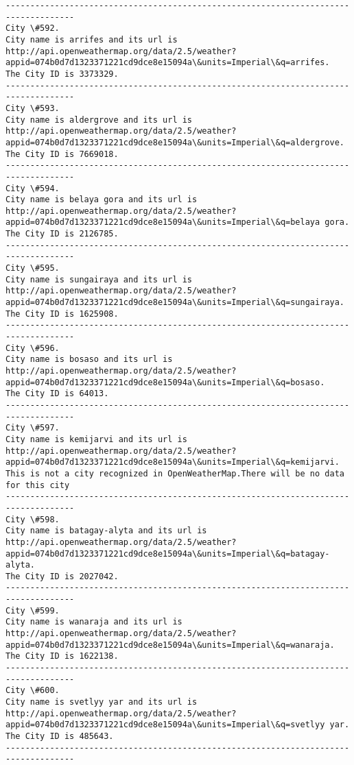 \documentclass[11pt]{article}
\begin{document}
\begin{Verbatim}[commandchars=\\\{\}]
------------------------------------------------------------------------------------
City \#592.
City name is arrifes and its url is http://api.openweathermap.org/data/2.5/weather?appid=074b0d7d1323371221cd9dce8e15094a\&units=Imperial\&q=arrifes.
The City ID is 3373329.
------------------------------------------------------------------------------------
City \#593.
City name is aldergrove and its url is http://api.openweathermap.org/data/2.5/weather?appid=074b0d7d1323371221cd9dce8e15094a\&units=Imperial\&q=aldergrove.
The City ID is 7669018.
------------------------------------------------------------------------------------
City \#594.
City name is belaya gora and its url is http://api.openweathermap.org/data/2.5/weather?appid=074b0d7d1323371221cd9dce8e15094a\&units=Imperial\&q=belaya gora.
The City ID is 2126785.
------------------------------------------------------------------------------------
City \#595.
City name is sungairaya and its url is http://api.openweathermap.org/data/2.5/weather?appid=074b0d7d1323371221cd9dce8e15094a\&units=Imperial\&q=sungairaya.
The City ID is 1625908.
------------------------------------------------------------------------------------
City \#596.
City name is bosaso and its url is http://api.openweathermap.org/data/2.5/weather?appid=074b0d7d1323371221cd9dce8e15094a\&units=Imperial\&q=bosaso.
The City ID is 64013.
------------------------------------------------------------------------------------
City \#597.
City name is kemijarvi and its url is http://api.openweathermap.org/data/2.5/weather?appid=074b0d7d1323371221cd9dce8e15094a\&units=Imperial\&q=kemijarvi.
This is not a city recognized in OpenWeatherMap.There will be no data for this city
------------------------------------------------------------------------------------
City \#598.
City name is batagay-alyta and its url is http://api.openweathermap.org/data/2.5/weather?appid=074b0d7d1323371221cd9dce8e15094a\&units=Imperial\&q=batagay-alyta.
The City ID is 2027042.
------------------------------------------------------------------------------------
City \#599.
City name is wanaraja and its url is http://api.openweathermap.org/data/2.5/weather?appid=074b0d7d1323371221cd9dce8e15094a\&units=Imperial\&q=wanaraja.
The City ID is 1622138.
------------------------------------------------------------------------------------
City \#600.
City name is svetlyy yar and its url is http://api.openweathermap.org/data/2.5/weather?appid=074b0d7d1323371221cd9dce8e15094a\&units=Imperial\&q=svetlyy yar.
The City ID is 485643.
------------------------------------------------------------------------------------

\end{Verbatim}
\end{document}
